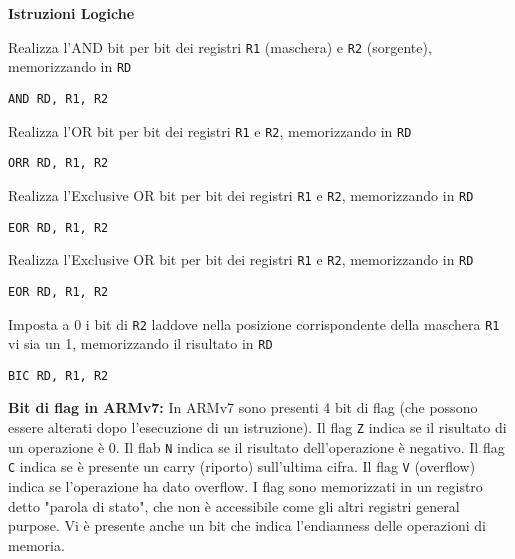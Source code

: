 \begin{defn}
	\textbf{Istruzioni Logiche}
	
	Realizza l'AND bit per bit dei registri \verb|R1| (maschera) e \verb|R2| (sorgente), memorizzando in \verb|RD|
	\begin{lstlisting}[style=arm]
	AND RD, R1, R2
	\end{lstlisting}
	
	Realizza l'OR bit per bit dei registri \verb|R1| e \verb|R2|, memorizzando in \verb|RD|
	\begin{lstlisting}[style=arm]
	ORR RD, R1, R2
	\end{lstlisting}
	
	Realizza l'Exclusive OR bit per bit dei registri \verb|R1| e \verb|R2|, memorizzando in \verb|RD|
	\begin{lstlisting}[style=arm]
	EOR RD, R1, R2
	\end{lstlisting}
	
	Realizza l'Exclusive OR bit per bit dei registri \verb|R1| e \verb|R2|, memorizzando in \verb|RD|
	\begin{lstlisting}[style=arm]
	EOR RD, R1, R2
	\end{lstlisting}
	
	Imposta a 0 i bit di \verb|R2| laddove nella posizione corrispondente della maschera \verb|R1| vi sia un 1, memorizzando il risultato in \verb|RD|
	\begin{lstlisting}[style=arm]
	BIC RD, R1, R2
	\end{lstlisting}
\end{defn}

\begin{defn}
	\textbf{Bit di flag in ARMv7:}
	In ARMv7 sono presenti 4 bit di flag (che possono essere alterati dopo l'esecuzione di un istruzione). Il flag \verb|Z| indica se il risultato di un operazione è 0. Il flab \verb|N| indica se il risultato dell'operazione è negativo. Il flag \verb|C| indica se è presente un carry (riporto) sull'ultima cifra. Il flag \verb|V| (overflow) indica se l'operazione ha dato overflow. I flag sono memorizzati in un registro detto "parola di stato", che non è accessibile come gli altri registri general purpose. Vi è presente anche un bit che indica l'endianness delle operazioni di memoria.
\end{defn}

